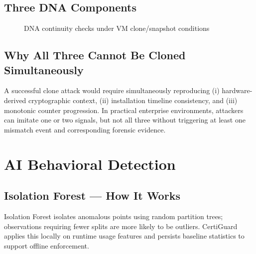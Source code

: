 \documentclass[11pt,a4paper]{article}
\begin{document}
\subsection{Three DNA Components}
\begin{figure}[H]
\centering
{}
\caption{DNA continuity checks under VM clone/snapshot conditions}
\end{figure}

\subsection{Why All Three Cannot Be Cloned Simultaneously}
A successful clone attack would require simultaneously reproducing (i) hardware-derived cryptographic context, (ii) installation timeline consistency, and (iii) monotonic counter progression. In practical enterprise environments, attackers can imitate one or two signals, but not all three without triggering at least one mismatch event and corresponding forensic evidence.

\section{AI Behavioral Detection}

\subsection{Isolation Forest --- How It Works}
Isolation Forest isolates anomalous points using random partition trees; observations requiring fewer splits are more likely to be outliers. CertiGuard applies this locally on runtime usage features and persists baseline statistics to support offline enforcement.
\end{document}
